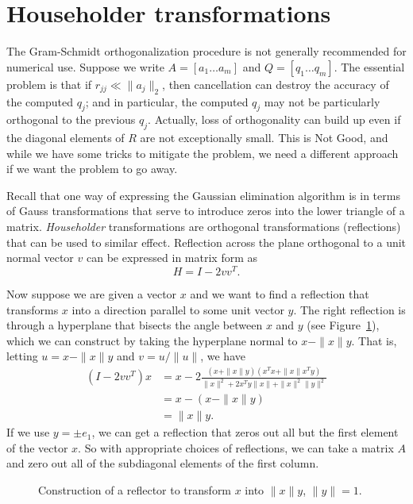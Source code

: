 \documentclass[12pt, leqno]{article} %
\begin{document}

\section{Householder transformations}

The Gram-Schmidt orthogonalization procedure is not generally
recommended for numerical use.  Suppose we write $A = [a_1 \ldots
  a_m]$ and $Q = [q_1 \ldots q_m]$.  The essential problem is that if
$r_{jj} \ll \|a_j\|_2$, then cancellation can destroy the accuracy of
the computed $q_j$; and in particular, the computed $q_j$ may not be
particularly orthogonal to the previous $q_j$.  Actually, loss of
orthogonality can build up even if the diagonal elements of $R$ are
not exceptionally small.  This is Not Good, and while we have some
tricks to mitigate the problem, we need a different approach if we
want the problem to go away.

Recall that one way of expressing the Gaussian elimination algorithm
is in terms of Gauss transformations that serve to introduce zeros
into the lower triangle of a matrix.  {\em Householder} transformations
are orthogonal transformations (reflections) that can be used to similar
effect.  Reflection across the plane orthogonal to a unit normal
vector $v$ can be expressed in matrix form as
\[
  H = I-2 vv^T.
\]

Now suppose we are given a vector $x$ and we want to find a reflection
that transforms $x$ into a direction parallel to some unit vector $y$.
The right reflection is through a hyperplane that bisects the angle
between $x$ and $y$ (see Figure~\ref{fig1}), which we can construct
by taking the hyperplane normal to $x-\|x\|y$.  That is,
letting $u = x - \|x\|y$ and $v = u/\|u\|$, we have
\begin{align*}
  (I-2vv^T)x
  & = x - 2\frac{(x+\|x\|y)(x^T x + \|x\| x^T y)}{\|x\|^2 + 2 x^T y \|x\| + \|x\|^2 \|y\|^2} \\
  & = x - (x-\|x\|y) \\
  & = \|x\|y.
\end{align*}
If we use $y = \pm e_1$, we can get a reflection that zeros out all but the
first element of the vector $x$.  So with appropriate choices of reflections,
we can take a matrix $A$ and zero out all of the subdiagonal elements
of the first column.

\begin{figure}
\begin{center}
\end{center}
\caption{Construction of a reflector to transform $x$ into $\|x\|y$,
         $\|y\| = 1$.}
\label{fig1}
\end{figure}
\end{document}
